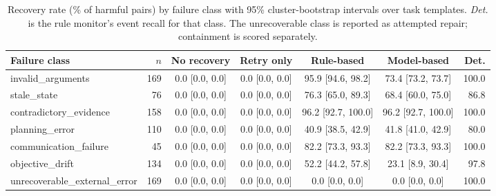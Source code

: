 \begin{table}[!ht]
\centering\scriptsize
\setlength{\tabcolsep}{4pt}
\caption{Recovery rate (\% of harmful pairs) by failure class with 95\% cluster-bootstrap intervals over task templates. \emph{Det.} is the rule monitor's event recall for that class. The unrecoverable class is reported as attempted repair; containment is scored separately.}
\label{tab:appendix_class}
\begin{adjustbox}{max width=\textwidth}
\begin{tabular}{@{}lrccccr@{}}
\toprule
Failure class & $n$ & No recovery & Retry only & Rule-based & Model-based & Det. \\
\midrule
invalid\_arguments & 169 & 0.0 [0.0, 0.0] & 0.0 [0.0, 0.0] & 95.9 [94.6, 98.2] & 73.4 [73.2, 73.7] & 100.0 \\
stale\_state & 76 & 0.0 [0.0, 0.0] & 0.0 [0.0, 0.0] & 76.3 [65.0, 89.3] & 68.4 [60.0, 75.0] & 86.8 \\
contradictory\_evidence & 158 & 0.0 [0.0, 0.0] & 0.0 [0.0, 0.0] & 96.2 [92.7, 100.0] & 96.2 [92.7, 100.0] & 100.0 \\
planning\_error & 110 & 0.0 [0.0, 0.0] & 0.0 [0.0, 0.0] & 40.9 [38.5, 42.9] & 41.8 [41.0, 42.9] & 80.0 \\
communication\_failure & 45 & 0.0 [0.0, 0.0] & 0.0 [0.0, 0.0] & 82.2 [73.3, 93.3] & 82.2 [73.3, 93.3] & 100.0 \\
objective\_drift & 134 & 0.0 [0.0, 0.0] & 0.0 [0.0, 0.0] & 52.2 [44.2, 57.8] & 23.1 [8.9, 30.4] & 97.8 \\
unrecoverable\_external\_error & 169 & 0.0 [0.0, 0.0] & 0.0 [0.0, 0.0] & 0.0 [0.0, 0.0] & 0.0 [0.0, 0.0] & 100.0 \\
\bottomrule
\end{tabular}
\end{adjustbox}
\end{table}
